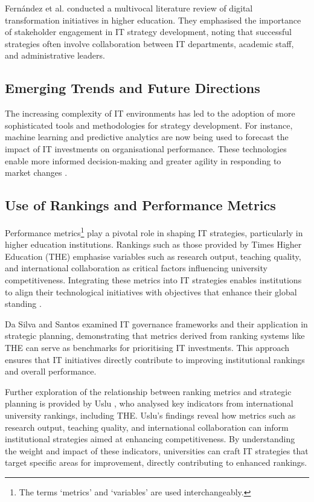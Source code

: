\documentclass[sigconf]{acmart}
\begin{document}
Fernández et al. \cite{fernandez2023digital} conducted a multivocal literature review of digital transformation initiatives in higher education. They emphasised the importance of stakeholder engagement in IT strategy development, noting that successful strategies often involve collaboration between IT departments, academic staff, and administrative leaders.

\subsection{Emerging Trends and Future Directions}

The increasing complexity of IT environments has led to the adoption of more sophisticated tools and methodologies for strategy development. For instance, machine learning and predictive analytics are now being used to forecast the impact of IT investments on organisational performance. These technologies enable more informed decision-making and greater agility in responding to market changes \cite{digitalsystems2022strategy}.


\subsection{Use of Rankings and Performance Metrics}

Performance metrics\footnote{The terms `metrics' and `variables' are used interchangeably.} play a pivotal role in shaping IT strategies, particularly in higher education institutions. Rankings such as those provided by Times Higher Education (THE) emphasise variables such as research output, teaching quality, and international collaboration as critical factors influencing university competitiveness. Integrating these metrics into IT strategies enables institutions to align their technological initiatives with objectives that enhance their global standing \cite{times2023methodology}.

Da Silva and Santos \cite{dasilva2014cobit} examined IT governance frameworks and their application in strategic planning, demonstrating that metrics derived from ranking systems like THE can serve as benchmarks for prioritising IT investments. This approach ensures that IT initiatives directly contribute to improving institutional rankings and overall performance.

Further exploration of the relationship between ranking metrics and strategic planning is provided by Uslu \cite{uslu2020university}, who analysed key indicators from international university rankings, including THE. Uslu's findings reveal how metrics such as research output, teaching quality, and international collaboration can inform institutional strategies aimed at enhancing competitiveness. By understanding the weight and impact of these indicators, universities can craft IT strategies that target specific areas for improvement, directly contributing to enhanced rankings.
\end{document}
